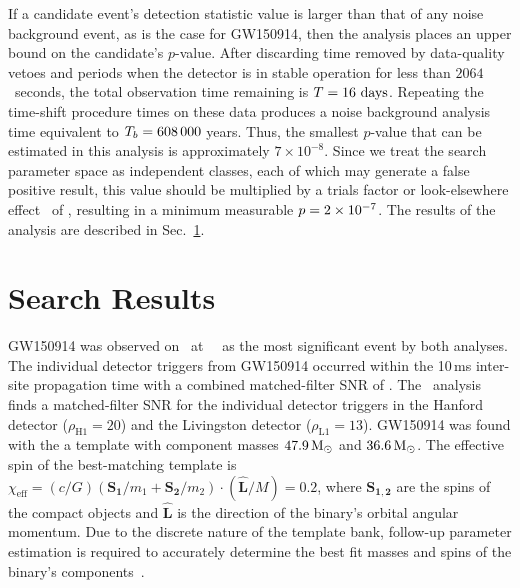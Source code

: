 If a candidate event's detection statistic value is larger than that of any
noise background event, as is the case for GW150914, then the \pycbc{}
analysis places an upper bound on the candidate's $p$-value.
After discarding time removed by data-quality vetoes and periods when the
detector is in stable operation for less than $2064$~seconds, the total
observation time remaining is $T= 16~\mathrm{days}$.  Repeating the time-shift
procedure {\PYCBCHOWMANYTIMESLIDES} times on these data produces a noise
background analysis time equivalent to $T_b=608\,000$ years.  Thus,
the smallest $p$-value that can be estimated in this analysis is
approximately $7\times 10^{-8}$. Since we treat the search parameter
space as \PYCBCTRIALFACTOR{} independent classes, each of which may generate a
false positive result, this value should be multiplied by a trials factor or
look-elsewhere effect~\cite{Lyons:1900zz} of \PYCBCTRIALFACTOR{}, resulting in
a minimum measurable $p = 2\times 10^{-7}$.  The
results of the \pycbc{} analysis are described in Sec.~\ref{s:results}.

\section{Search Results}
\label{s:results}

GW150914 was observed on \OBSEVENTDATEMONTHDAYYEAR\ at \OBSEVENTTIME
~\OBSEVENTTZ\ as the most significant event by both analyses. The individual
detector triggers from GW150914 occurred within the 10\,ms inter-site
propagation time with a combined matched-filter SNR of
\OBSEVENTAPPROXCOMBINEDSNR. The \pycbc{}\ analysis finds a matched-filter SNR
for the individual detector triggers in the Hanford detector
($\rho_\textrm{H1} = 20$) and the Livingston detector ($\rho_\textrm{L1} =
13$).  GW150914 was found with the a template with
component masses $47.9\,\mathrm{M}_\odot$ and
$36.6\,\mathrm{M}_\odot$. The effective spin of the best-matching
template is $\chi_{\text{eff}} = (c/G) (\mathbf{S_1}/m_1 + \mathbf{S_2}/m_2)
\cdot (\mathbf{\hat{L}}/M) = 0.2$, where $\mathbf{S_{1,2}}$ are the spins of
the compact objects and $\mathbf{\hat{L}}$ is the direction of the binary's
orbital angular momentum. Due to the discrete nature of the template bank,
follow-up parameter estimation is required to accurately determine the best
fit masses and spins of the binary's components~\cite{Veitch:2014wba,
GW150914-PARAMESTIM}. 

